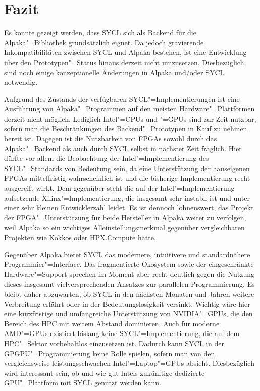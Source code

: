 \chapter{Fazit}
\label{fazit}

Es konnte gezeigt werden, dass SYCL sich als Backend für die Alpaka"=Bibliothek
grundsätzlich eignet. Da jedoch gravierende Inkompatibilitäten zwischen SYCL und
Alpaka bestehen, ist eine Entwicklung über den Prototypen"=Status hinaus derzeit
nicht umzusetzen. Diesbezüglich sind noch einige konzeptionelle Änderungen in
Alpaka und/oder SYCL notwendig.

Aufgrund des Zustands der verfügbaren SYCL"=Implementierungen ist eine
Ausführung von Alpaka"=Programmen auf den meisten Hardware"=Plattformen derzeit
nicht möglich. Lediglich Intel"=CPUs und "=GPUs sind zur Zeit nutzbar, sofern
man die Beschränkungen des Backend"=Prototypen in Kauf zu nehmen bereit ist.
Dagegen ist die Nutzbarkeit von FPGAs sowohl durch das Alpaka"=Backend als auch
durch SYCL selbst in nächster Zeit fraglich. Hier dürfte vor allem die
Beobachtung der Intel"=Implementierung des SYCL"=Standards von Bedeutung sein,
da eine Unterstützung der hauseigenen FPGAs mittelfristig wahrscheinlich ist und
die bisherige Implementierung recht ausgereift wirkt. Dem gegenüber steht die
auf der Intel"=Implementierung aufsetzende Xilinx"=Implementierung, die
insgesamt sehr instabil ist und unter einer sehr kleinen Entwicklerzahl leidet.
Es ist dennoch lohnenswert, das Projekt der FPGA"=Unterstützung für beide
Hersteller in Alpaka weiter zu verfolgen, weil Alpaka so ein wichtiges
Alleinstellungsmerkmal gegenüber vergleichbaren Projekten wie Kokkos oder
HPX.Compute hätte.

Gegenüber Alpaka bietet SYCL das modernere, intuitivere und standardnähere
Programmier"=Interface. Das fragmentierte Ökosystem sowie der eingeschränkte
Hardware"=Support sprechen im Moment aber recht deutlich gegen die Nutzung
dieses insgesamt vielversprechenden Ansatzes zur parallelen Programmierung. Es
bleibt daher abzuwarten, ob SYCL in den nächsten Monaten und Jahren weitere
Verbreitung erfährt oder in der Bedeutungslosigkeit versinkt. Wichtig wäre hier
eine kurzfristige und umfangreiche Unterstützung von NVIDIA"=GPUs, die
den Bereich des HPC mit weitem Abstand dominieren. Auch für moderne AMD"=GPUs
existiert bislang keine SYCL"=Implementierung, die auf dem HPC"=Sektor
vorbehaltlos einzusetzen ist. Dadurch kann SYCL in der GPGPU"=Programmierung
keine Rolle spielen, sofern man von den vergleichsweise leistungsschwachen
Intel"=Laptop"=GPUs absieht. Diesbezüglich wird interessant sein, ob und wie gut
Intels zukünftige dedizierte GPU"=Plattform mit SYCL genutzt werden kann.
